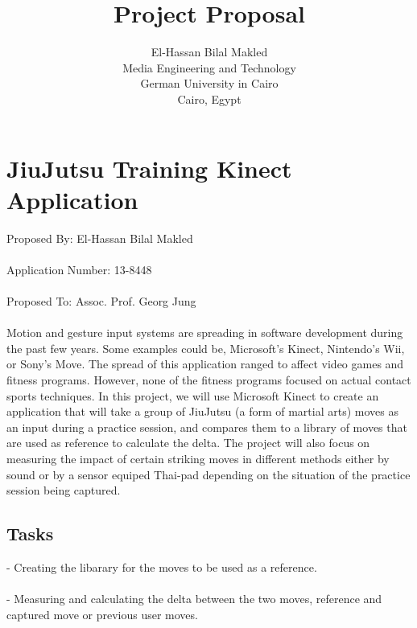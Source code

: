 \documentclass[11pt]{article} %
\title{Project Proposal}
\author{El-Hassan Bilal Makled\\Media Engineering and Technology\\ German University in Cairo\\ Cairo, Egypt}
\begin{document}
\maketitle
\pagebreak
\section{JiuJutsu Training Kinect Application}
Proposed By: El-Hassan Bilal Makled
\\
\\
Application Number: 13-8448
\\
\\
Proposed To: Assoc. Prof. Georg Jung
\\
\\
Motion and gesture input systems are spreading in software development during the past few years. Some examples could be, Microsoft's Kinect, Nintendo's Wii, or Sony's Move. 
The spread of this application ranged to affect video games and fitness programs. However, none of the fitness programs focused on actual contact sports techniques. 
In this project, we will use Microsoft Kinect to create an application that will take a group of JiuJutsu (a form of martial arts) moves as an input during a practice session, 
and compares them to a library of moves that are used as reference to calculate the delta. 
The project will also focus on measuring the impact of certain striking moves in different 
methods either by sound or by a sensor equiped Thai-pad depending on the situation of the practice session being captured.  
\subsection{Tasks}
- Creating the libarary for the moves to be used as a reference.
\\
\\
- Measuring and calculating the delta between the two moves, reference and captured move or previous user moves.
\end{document}
